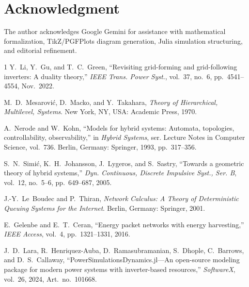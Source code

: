 \documentclass[journal]{IEEEtran}
\begin{document}
\section*{Acknowledgment}
The author acknowledges Google Gemini for assistance with mathematical formalization, TikZ/PGFPlots diagram generation, Julia simulation structuring, and editorial refinement.

\begin{thebibliography}{1}
Y.~Li, Y.~Gu, and T.~C.~Green, ``Revisiting grid-forming and grid-following inverters: A duality theory,'' \emph{IEEE Trans. Power Syst.}, vol.~37, no.~6, pp.~4541--4554, Nov.~2022.

M.~D.~Mesarovi\'{c}, D.~Macko, and Y.~Takahara, \emph{Theory of Hierarchical, Multilevel, Systems}. New York, NY, USA: Academic Press, 1970.

A.~Nerode and W.~Kohn, ``Models for hybrid systems: Automata, topologies, controllability, observability,'' in \emph{Hybrid Systems}, ser. Lecture Notes in Computer Science, vol.~736. Berlin, Germany: Springer, 1993, pp.~317--356.

S.~N.~Simi\'{c}, K.~H.~Johansson, J.~Lygeros, and S.~Sastry, ``Towards a geometric theory of hybrid systems,'' \emph{Dyn. Continuous, Discrete Impulsive Syst., Ser. B}, vol.~12, no.~5--6, pp.~649--687, 2005.

J.-Y.~Le~Boudec and P.~Thiran, \emph{Network Calculus: A Theory of Deterministic Queuing Systems for the Internet}. Berlin, Germany: Springer, 2001.

E.~Gelenbe and E.~T.~Ceran, ``Energy packet networks with energy harvesting,'' \emph{IEEE Access}, vol.~4, pp.~1321--1331, 2016.

J.~D.~Lara, R.~Henriquez-Auba, D.~Ramasubramanian, S.~Dhople, C.~Barrows, and D.~S.~Callaway, ``PowerSimulationsDynamics.jl---An open-source modeling package for modern power systems with inverter-based resources,'' \emph{SoftwareX}, vol.~26, 2024, Art.~no.~101668.
\end{thebibliography}
\end{document}
